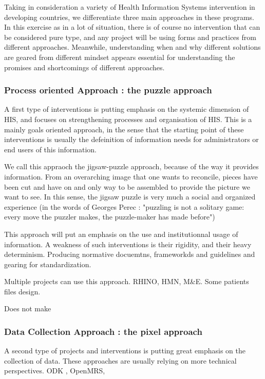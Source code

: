 Taking in consideration a variety of Health Information Systems intervention in developing countries, we differentiate three main approaches in these programs. In this exercise as in a lot of situation, there is of course no intervention that can be considered pure type, and any project will be using forms and practices from different approaches. Meanwhile, understanding when and why different solutions are geared from different mindset appears essential for understanding the promises and shortcomings of different approaches.

\subsubsection{Process oriented Approach : the puzzle approach}

A first type of interventions is putting emphasis on the systemic dimension of HIS, and focuses on strengthening processes and organisation of HIS. This is a mainly goals oriented approach, in the sense that the starting point of these interventions is usually the defeinition of information needs for administrators or end users of this information.

We call this appraoch the jigsaw-puzzle approach, because of the way it provides information. From an overarching image that one wants to reconcile, pieces have been cut and have on and only way to be assembled to provide the picture we want to see. In this sense, the jigsaw puzzle is very much a social and organized experience (in the words of Georges Perec : "puzzling is not a solitary game: every move the puzzler makes, the puzzle-maker has made before")

This approach will put an emphasis on the use and institutionnal usage of information. A weakness of such interventions is their rigidity, and their heavy determinism. Producing normative docuemtns, frameworkds and guidelines and gearing for standardization.

Multiple projects can use this approach. RHINO, HMN, M&E. Some patients files design.

Does not make

\cite{rhino_introducing_2003}

\subsubsection{Data Collection Approach : the pixel approach}

A second type of projects and interventions is putting great emphasis on the collection of data. These approaches are usually relying on more technical perspectives. ODK , OpenMRS,

